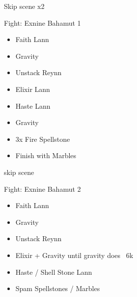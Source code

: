 Skip scene x2
 
\begin{battle}[]{Fight: Exnine Bahamut 1}
    \begin{itemize}
        \item Faith Lann
        \item Gravity
        \item Unstack Reynn
        \item Elixir Lann
        \item Haste Lann
        \item Gravity
        \item 3x Fire Spellstone
        \item Finish with Marbles
    \end{itemize}
\end{battle}
skip scene
\begin{battle}[]{Fight: Exnine Bahamut 2}
    \begin{itemize}
        \item Faith Lann
        \item Gravity
        \item Unstack Reynn
        \item Elixir + Gravity until gravity does ~6k
        \item Haste / Shell Stone Lann
        \item Spam Spellstones / Marbles
    \end{itemize}
\end{battle}